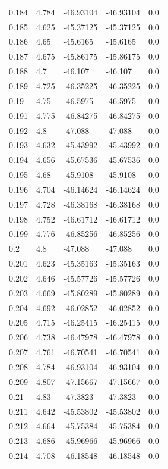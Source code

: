 \begin{tabular}{lllll}
0.184 & 4.784 & -46.93104 & -46.93104 & 0.0 \\
0.185 & 4.625 & -45.37125 & -45.37125 & 0.0 \\
0.186 & 4.65 & -45.6165 & -45.6165 & 0.0 \\
0.187 & 4.675 & -45.86175 & -45.86175 & 0.0 \\
0.188 & 4.7 & -46.107 & -46.107 & 0.0 \\
0.189 & 4.725 & -46.35225 & -46.35225 & 0.0 \\
0.19 & 4.75 & -46.5975 & -46.5975 & 0.0 \\
0.191 & 4.775 & -46.84275 & -46.84275 & 0.0 \\
0.192 & 4.8 & -47.088 & -47.088 & 0.0 \\
0.193 & 4.632 & -45.43992 & -45.43992 & 0.0 \\
0.194 & 4.656 & -45.67536 & -45.67536 & 0.0 \\
0.195 & 4.68 & -45.9108 & -45.9108 & 0.0 \\
0.196 & 4.704 & -46.14624 & -46.14624 & 0.0 \\
0.197 & 4.728 & -46.38168 & -46.38168 & 0.0 \\
0.198 & 4.752 & -46.61712 & -46.61712 & 0.0 \\
0.199 & 4.776 & -46.85256 & -46.85256 & 0.0 \\
0.2 & 4.8 & -47.088 & -47.088 & 0.0 \\
0.201 & 4.623 & -45.35163 & -45.35163 & 0.0 \\
0.202 & 4.646 & -45.57726 & -45.57726 & 0.0 \\
0.203 & 4.669 & -45.80289 & -45.80289 & 0.0 \\
0.204 & 4.692 & -46.02852 & -46.02852 & 0.0 \\
0.205 & 4.715 & -46.25415 & -46.25415 & 0.0 \\
0.206 & 4.738 & -46.47978 & -46.47978 & 0.0 \\
0.207 & 4.761 & -46.70541 & -46.70541 & 0.0 \\
0.208 & 4.784 & -46.93104 & -46.93104 & 0.0 \\
0.209 & 4.807 & -47.15667 & -47.15667 & 0.0 \\
0.21 & 4.83 & -47.3823 & -47.3823 & 0.0 \\
0.211 & 4.642 & -45.53802 & -45.53802 & 0.0 \\
0.212 & 4.664 & -45.75384 & -45.75384 & 0.0 \\
0.213 & 4.686 & -45.96966 & -45.96966 & 0.0 \\
0.214 & 4.708 & -46.18548 & -46.18548 & 0.0 \\

\end{tabular}
